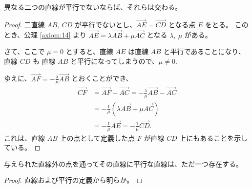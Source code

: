 \begin{thm}\label{theorem:29}
  異なる二つの直線が平行でないならば、それらは交わる。
\end{thm}

\begin{proof}
  二直線 \(AB,\ CD\) が平行でないとし、\(\overrightarrow{AE}=\overrightarrow{CD}\) となる点 \(E\) をとる。
  このとき、公理 \ref{axiom:14} より \(\overrightarrow{AE}=\lambda\overrightarrow{AB}+\mu\overrightarrow{AC}\) となる \(\lambda,\ \mu\) がある。

  さて、ここで \(\mu=0\) とすると、直線 \(AE\) は直線 \(AB\) と平行であることになり、直線 \(CD\) も 直線 \(AB\) と平行になってしまうので、\(\mu\neq0.\)

  ゆえに、\(\displaystyle \overrightarrow{AF}=-\frac{\lambda}{\mu}\overrightarrow{AB}\) とおくことができ、
  \begin{align*}
    \overrightarrow{CF} &= \overrightarrow{AF}-\overrightarrow{AC}=-\frac{\lambda}{\mu}\overrightarrow{AB}-\overrightarrow{AC} \\
                        &= -\frac{1}{\mu}(\lambda\overrightarrow{AB}+\mu\overrightarrow{AC}) \\
                        &= -\frac{1}{\mu}\overrightarrow{AE}=-\frac{1}{\mu}\overrightarrow{CD}.
  \end{align*}
  これは、直線 \(AB\) 上の点として定義した点 \(F\) が直線 \(CD\) 上にもあることを示している。
\end{proof}

\begin{thm}\label{theorem:30}
  与えられた直線外の点を通ってその直線に平行な直線は、ただ一つ存在する。
\end{thm}

\begin{proof}
  直線および平行の定義から明らか。
\end{proof}
